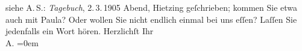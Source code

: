 \begin{ledgroupsized}[t]{13cm}
{{{                     siehe A. S.: \emph{Tagebuch}, 2. 3. 1905}}}\label{K_L01502_3h}{ }Abend, Hietzing geſchrieben; kommen
               Sie etwa auch mit Paula? Oder wollen Sie nicht
               endlich einmal bei uns eſſen?\pend
           \pstart
           Laſſen Sie jedenfalls ein Wort hören.\pend
           \pstart
           Herzlichſt Ihr{\\[\baselineskip]}\spacefill\mbox{A.}\pend
           \leftskip=0em{}
         
         \endnumbering{}\end{ledgroupsized}  \newcommand{\dateiname}{L01502}\newcommand{\titel}{Arthur Schnitzler an Richard Beer-Hofmann, 26. 2. 1905}\newcommand{\editorInnen}{Martin Anton Müller und Gerd-Hermann Susen}
      